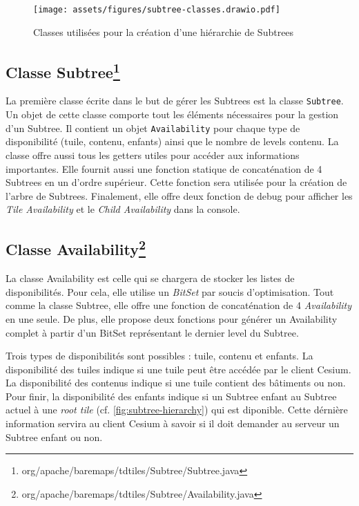 \begin{figure}[H]
    \centering
    \texttt{[image: assets/figures/subtree-classes.drawio.pdf]}
    \caption{Classes utilisées pour la création d'une hiérarchie de Subtrees}
    \label{fig:subtree-classes}
\end{figure}

\subsection*{Classe Subtree\footnote{org/apache/baremaps/tdtiles/Subtree/Subtree.java}}
\label{sec:subtree-class}

La première classe écrite dans le but de gérer les Subtrees est la classe \texttt{Subtree}. Un objet de cette classe comporte tout les éléments nécessaires pour la gestion d'un Subtree. Il contient un objet \texttt{Availability} pour chaque type de disponibilité (tuile, contenu, enfants) ainsi que le nombre de levels contenu. La classe offre aussi tous les getters utiles pour accéder aux informations importantes. Elle fournit aussi une fonction statique de concaténation de 4 Subtrees en un d'ordre supérieur. Cette fonction sera utilisée pour la création de l'arbre de Subtrees. Finalement, elle offre deux fonction de debug pour afficher les \textit{Tile Availability} et le \textit{Child Availability} dans la console.

\subsection*{Classe Availability\footnote{org/apache/baremaps/tdtiles/Subtree/Availability.java}}
\label{sec:availability-class}

La classe Availability est celle qui se chargera de stocker les listes de disponibilités. Pour cela, elle utilise un \textit{BitSet} par soucis d'optimisation. Tout comme la classe Subtree, elle offre une fonction de concaténation de 4 \textit{Availability} en une seule. De plus, elle propose deux fonctions pour générer un Availability complet à partir d'un BitSet représentant le dernier level du Subtree.

Trois types de disponibilités sont possibles : tuile, contenu et enfants. La disponibilité des tuiles indique si une tuile peut être accédée par le client Cesium. La disponibilité des contenus indique si une tuile contient des bâtiments ou non. Pour finir, la disponibilité des enfants indique si un Subtree enfant au Subtree actuel à une \textit{root tile} (cf. \autoref{fig:subtree-hierarchy}) qui est diponible. Cette dérnière information servira au client Cesium à savoir si il doit demander au serveur un Subtree enfant ou non.

